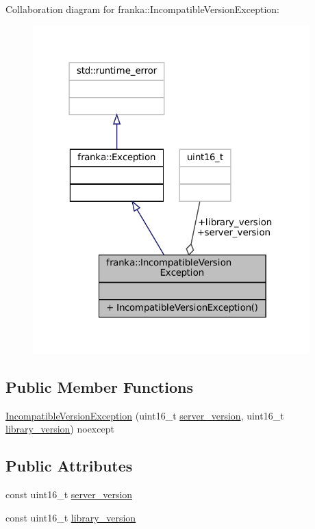 Collaboration diagram for franka\+:\+:Incompatible\+Version\+Exception\+:
\nopagebreak
\begin{figure}[H]
\begin{center}
\leavevmode
\includegraphics[width=303pt]{structfranka_1_1IncompatibleVersionException__coll__graph}
\end{center}
\end{figure}
\subsection*{Public Member Functions}
\begin{DoxyCompactItemize}
\item 
\hyperlink{structfranka_1_1IncompatibleVersionException_a518f40d994ed7e970c6f7fdafb673239}{Incompatible\+Version\+Exception} (uint16\+\_\+t \hyperlink{structfranka_1_1IncompatibleVersionException_a0928098d8c32f405d17b65a0f004b5ab}{server\+\_\+version}, uint16\+\_\+t \hyperlink{structfranka_1_1IncompatibleVersionException_a81e6d7f01965ed7ee34f83dc3883ad01}{library\+\_\+version}) noexcept
\end{DoxyCompactItemize}
\subsection*{Public Attributes}
\begin{DoxyCompactItemize}
\item 
const uint16\+\_\+t \hyperlink{structfranka_1_1IncompatibleVersionException_a0928098d8c32f405d17b65a0f004b5ab}{server\+\_\+version}
\item 
const uint16\+\_\+t \hyperlink{structfranka_1_1IncompatibleVersionException_a81e6d7f01965ed7ee34f83dc3883ad01}{library\+\_\+version}
\end{DoxyCompactItemize}


